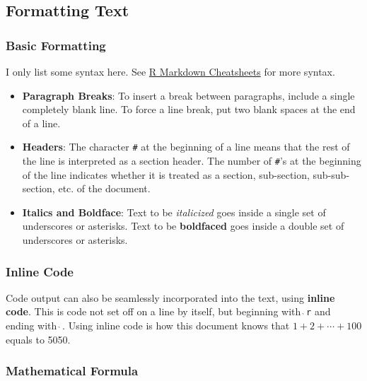 \documentclass[
  11pt,
]{article}
\begin{document}
\hypertarget{formatting-text}{%
\subsection{Formatting Text}\label{formatting-text}}

\hypertarget{basic-formatting}{%
\subsubsection{Basic Formatting}\label{basic-formatting}}

I only list some syntax here. See
\href{https://rmarkdown.rstudio.com/lesson-15.html}{R Markdown
Cheatsheets} for more syntax.

\begin{itemize}
\item
  \textbf{Paragraph Breaks}: To insert a break between paragraphs,
  include a single completely blank line. To force a line break, put two
  blank spaces at the end of a line.
\item
  \textbf{Headers}: The character \texttt{\#} at the beginning of a line
  means that the rest of the line is interpreted as a section header.
  The number of \texttt{\#}'s at the beginning of the line indicates
  whether it is treated as a section, sub-section, sub-sub-section, etc.
  of the document.
\item
  \textbf{Italics and Boldface}: Text to be \emph{italicized} goes
  inside a single set of underscores or asterisks. Text to be
  \textbf{boldfaced} goes inside a double set of underscores or
  asterisks.
\end{itemize}

\hypertarget{inline-code}{%
\subsubsection{Inline Code}\label{inline-code}}

Code output can also be seamlessly incorporated into the text, using
\textbf{inline code}. This is code not set off on a line by itself, but
beginning with \texttt{$\grave{\ }$r} and ending with
\texttt{$\grave{\ }$}. Using inline code is how this document knows that
\(1+2+\cdots+100\) equals to 5050.

\hypertarget{mathematical-formula}{%
\subsubsection{Mathematical Formula}\label{mathematical-formula}}
\end{document}
